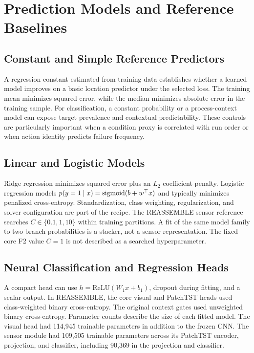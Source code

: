\section{Prediction Models and Reference Baselines}
\subsection{Constant and Simple Reference Predictors}
A regression constant estimated from training data establishes whether a learned model improves on a basic location predictor under the selected loss. The training mean minimizes squared error, while the median minimizes absolute error in the training sample. For classification, a constant probability or a process-context model can expose target prevalence and contextual predictability. These controls are particularly important when a condition proxy is correlated with run order or when action identity predicts failure frequency.

\subsection{Linear and Logistic Models}
Ridge regression minimizes squared error plus an $L_2$ coefficient penalty. Logistic regression models $p(y=1\mid x)=\operatorname{sigmoid}(b+w^\top x)$ and typically minimizes penalized cross-entropy. Standardization, class weighting, regularization, and solver configuration are part of the recipe. The REASSEMBLE sensor reference searches $C\in\{0.1,1,10\}$ within training partitions. A fit of the same model family to two branch probabilities is a stacker, not a sensor representation. The fixed core F2 value $C=1$ is not described as a searched hyperparameter.

\subsection{Neural Classification and Regression Heads}
A compact head can use $h=\mathrm{ReLU}(W_1x+b_1)$, dropout during fitting, and a scalar output. In REASSEMBLE, the core visual and PatchTST heads used class-weighted binary cross-entropy. The original context gates used unweighted binary cross-entropy. Parameter counts describe the size of each fitted model. The visual head had 114,945 trainable parameters in addition to the frozen CNN. The sensor module had 109,505 trainable parameters across its PatchTST encoder, projection, and classifier, including 90,369 in the projection and classifier.

